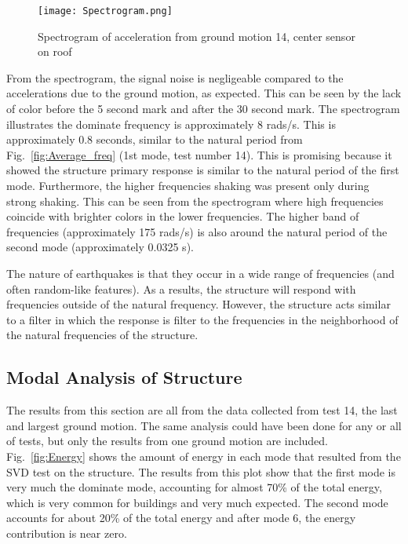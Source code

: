 \documentclass{article}
\begin{document}
\begin{figure}
    \centering
    \texttt{[image: Spectrogram.png]}
    \caption{Spectrogram of acceleration from ground motion 14, center sensor on roof}
    \label{fig:Spectrogram}
\end{figure}

\medskip

From the spectrogram, the signal noise is negligeable compared to the accelerations due to the ground motion, as expected. This can be seen by the lack of color before the 5 second mark and after the 30 second mark. The spectrogram illustrates the dominate frequency is approximately 8 rads/s. This is approximately 0.8 seconds, similar to the natural period from Fig.\ \ref{fig:Average_freq} (1st mode, test number 14). This is promising because it showed the structure primary response is similar to the natural period of the first mode. Furthermore, the higher frequencies shaking was present only during strong shaking. This can be seen from the spectrogram where high frequencies coincide with brighter colors in the lower frequencies. The higher band of frequencies (approximately 175 rads/s) is also around the natural period of the second mode (approximately 0.0325 s).

\medskip

The nature of earthquakes is that they occur in a wide range of frequencies (and often random-like features). As a results, the structure will respond with frequencies outside of the natural frequency. However, the structure acts similar to a filter in which the response is filter to the frequencies in the neighborhood of the natural frequencies of the structure.

\FloatBarrier
\subsection{Modal Analysis of Structure}

The results from this section are all from the data collected from test 14, the last and largest ground motion. The same analysis could have been done for any or all of tests, but only the results from one ground motion are included. Fig.\  \ref{fig:Energy} shows the amount of energy in each mode that resulted from the SVD test on the structure. The results from this plot show that the first mode is very much the dominate mode, accounting for almost 70\% of the total energy, which is very common for buildings and very much expected. The second mode accounts for about 20\% of the total energy and after mode 6, the energy contribution is near zero. 
\end{document}
